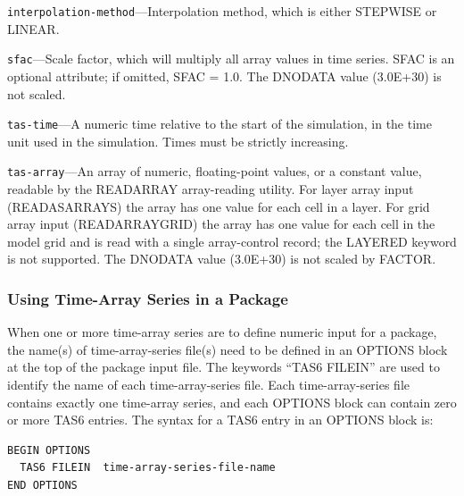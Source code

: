\begin{description}
\item \texttt{interpolation-method}---Interpolation method, which is either STEPWISE or LINEAR.
\end{description}

\begin{description}
\item \texttt{sfac}---Scale factor, which will multiply all array values in time series. SFAC is an optional attribute; if omitted, SFAC = 1.0. The DNODATA value (3.0E+30) is not scaled.
\end{description}

\begin{description}
\item \texttt{tas-time}---A numeric time relative to the start of the simulation, in the time unit used in the simulation. Times must be strictly increasing.
\end{description}

\begin{description}
\item \texttt{tas-array}---An array of numeric, floating-point values, or a constant value, readable by the READARRAY array-reading utility. For layer array input (READASARRAYS) the array has one value for each cell in a layer. For grid array input (READARRAYGRID) the array has one value for each cell in the model grid and is read with a single array-control record; the LAYERED keyword is not supported. The DNODATA value (3.0E+30) is not scaled by FACTOR.
\end{description}

\subsubsection{Using Time-Array Series in a Package}
When one or more time-array series are to define numeric input for a package, the name(s) of time-array-series file(s) need to be defined in an OPTIONS block at the top of the package input file. The keywords ``TAS6 FILEIN'' are used to identify the name of each time-array-series file. Each time-array-series file contains exactly one time-array series, and each OPTIONS block can contain zero or more TAS6 entries. The syntax for a TAS6 entry in an OPTIONS block is:

\begin{lstlisting}[style=blockdefinition]
BEGIN OPTIONS
  TAS6 FILEIN  time-array-series-file-name
END OPTIONS
\end{lstlisting}

